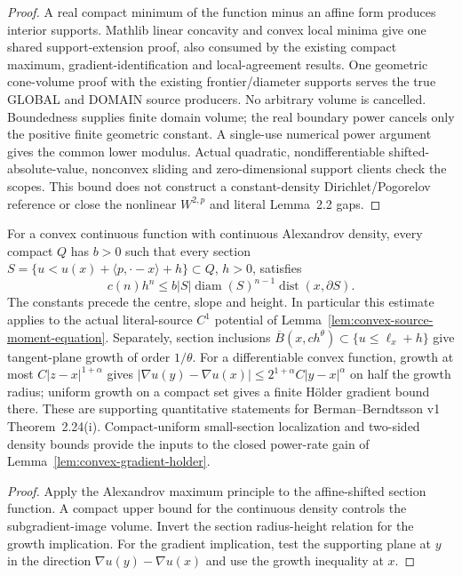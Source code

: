 \begin{proof}
  \leanok
  A real compact minimum of the function minus an affine form produces
  interior supports. Mathlib linear concavity and convex local minima give
  one shared support-extension proof, also consumed by the existing compact
  maximum, gradient-identification and local-agreement results. One geometric
  cone-volume proof with the existing frontier/diameter supports serves the
  true GLOBAL and DOMAIN source producers. No arbitrary volume is cancelled. Boundedness supplies finite domain volume;
  the real boundary power cancels only the positive finite geometric constant.
  A single-use numerical power argument gives the common lower modulus.
  Actual quadratic, nondifferentiable shifted-absolute-value, nonconvex
  sliding and zero-dimensional support clients check the scopes. This bound
  does not construct a constant-density Dirichlet/Pogorelov reference or close
  the nonlinear $W^{2,p}$ and literal Lemma~2.2 gaps.
\end{proof}


\begin{lemma}
  \label{lem:convex-section-growth}
  \leanok
  For a convex continuous function with continuous Alexandrov density, every compact $Q$
  has $b>0$ such that every section $S=\{u<u(x)+\langle p,\cdot-x\rangle+h\}\subset Q$,
  $h>0$, satisfies
  \[
    c(n)h^n\le b|S|\operatorname{diam}(S)^{n-1}\operatorname{dist}(x,\partial S).
  \]
  The constants precede the centre, slope and height. In particular this estimate applies to
  the actual literal-source $C^1$ potential of Lemma~\ref{lem:convex-source-moment-equation}.
  Separately, section inclusions $\overline B(x,ch^\theta)\subset\{u\le\ell_x+h\}$ give
  tangent-plane growth of order $1/\theta$. For a differentiable convex function, growth
  at most $C|z-x|^{1+\alpha}$ gives
  $|\nabla u(y)-\nabla u(x)|\le2^{1+\alpha}C|y-x|^\alpha$ on half the growth radius;
  uniform growth on a compact set gives a finite H\"older gradient bound there.
  These are supporting quantitative statements for Berman--Berndtsson v1 Theorem~2.24(i).
  Compact-uniform small-section localization and two-sided density bounds provide the
  inputs to the closed power-rate gain of Lemma~\ref{lem:convex-gradient-holder}.
\end{lemma}
\begin{proof}
  \leanok
  Apply the Alexandrov maximum principle to the affine-shifted section function. A compact
  upper bound for the continuous density controls the subgradient-image volume. Invert the
  section radius-height relation for the growth implication. For the gradient implication,
  test the supporting plane at $y$ in the direction $\nabla u(y)-\nabla u(x)$ and use the
  growth inequality at $x$.
\end{proof}


